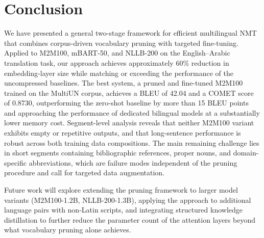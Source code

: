\documentclass{article}
\begin{document}
	\section{Conclusion}
	\label{sec:conclusion}
	
	We have presented a general two-stage framework for efficient multilingual NMT that
	combines corpus-driven vocabulary pruning with targeted fine-tuning. Applied to M2M100,
	mBART-50, and NLLB-200 on the English--Arabic translation task, our approach achieves
	approximately 60\% reduction in embedding-layer size while matching or exceeding the
	performance of the uncompressed baselines. The best system, a pruned and fine-tuned
	M2M100 trained on the MultiUN corpus, achieves a BLEU of 42.04 and a COMET score of
	0.8730, outperforming the zero-shot baseline by more than 15 BLEU points and approaching
	the performance of dedicated bilingual models at a substantially lower memory cost.
	Segment-level analysis reveals that neither M2M100 variant exhibits empty or repetitive
	outputs, and that long-sentence performance is robust across both training data compositions.
	The main remaining challenge lies in short segments containing bibliographic references,
	proper nouns, and domain-specific abbreviations, which are failure modes independent of the
	pruning procedure and call for targeted data augmentation.
	
	Future work will explore extending the pruning framework to larger model variants
	(M2M100-1.2B, NLLB-200-1.3B), applying the approach to additional language pairs with
	non-Latin scripts, and integrating structured knowledge distillation to further reduce the
	parameter count of the attention layers beyond what vocabulary pruning alone achieves.
	


\end{document}
